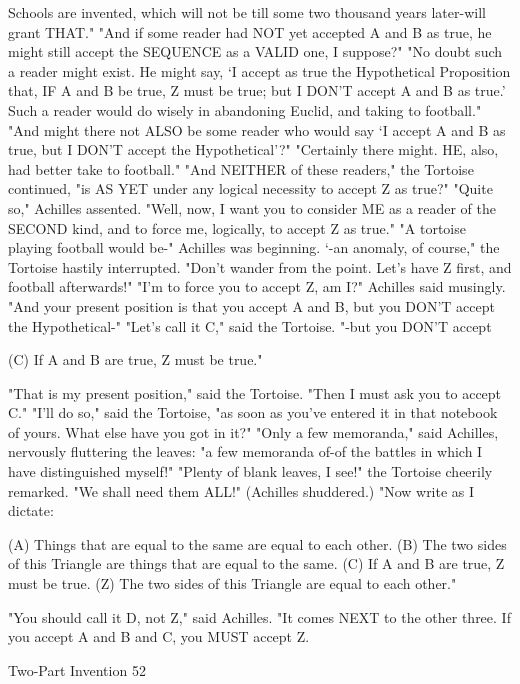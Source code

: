 Schools are invented, which will not be till some two thousand years later-will grant
THAT."
   "And if some reader had NOT yet accepted A and B as true, he might still accept the
SEQUENCE as a VALID one, I suppose?"
   "No doubt such a reader might exist. He might say, `I accept as true the Hypothetical
Proposition that, IF A and B be true, Z must be true; but I DON'T accept A and B as true.'
Such a reader would do wisely in abandoning Euclid, and taking to football."
   "And might there not ALSO be some reader who would say `I accept A and B as true,
but I DON'T accept the Hypothetical'?"
   "Certainly there might. HE, also, had better take to football."
   "And NEITHER of these readers," the Tortoise continued, "is AS YET under any
logical necessity to accept Z as true?"
   "Quite so," Achilles assented.
   "Well, now, I want you to consider ME as a reader of the SECOND kind, and to force
me, logically, to accept Z as true."
   "A tortoise playing football would be-" Achilles was beginning.
   `-an anomaly, of course," the Tortoise hastily interrupted. "Don't wander from the
point. Let's have Z first, and football afterwards!"
   "I'm to force you to accept Z, am I?" Achilles said musingly. "And your present
position is that you accept A and B, but you DON'T accept the Hypothetical-"
   "Let's call it C," said the Tortoise.
   "-but you DON'T accept

  (C) If A and B are true, Z must be true."

  "That is my present position," said the Tortoise.
  "Then I must ask you to accept C."
  "I'll do so," said the Tortoise, "as soon as you've entered it in that notebook of yours.
What else have you got in it?"
  "Only a few memoranda," said Achilles, nervously fluttering the leaves: "a few
memoranda of-of the battles in which I have distinguished myself!"
  "Plenty of blank leaves, I see!" the Tortoise cheerily remarked. "We shall need them
ALL!" (Achilles shuddered.) "Now write as I dictate:

  (A) Things that are equal to the same are equal to each other.
  (B) The two sides of this Triangle are things that are equal to the same.
  (C) If A and B are true, Z must be true.
  (Z) The two sides of this Triangle are equal to each other."

   "You should call it D, not Z," said Achilles. "It comes NEXT to the other three. If you
accept A and B and C, you MUST accept Z.




Two-Part Invention                                                                      52

